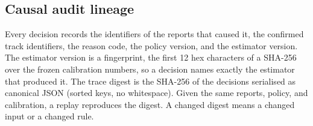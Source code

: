 \subsection{Causal audit lineage}
Every decision records the identifiers of the reports that caused it, the
confirmed track identifiers, the reason code, the policy version, and the
estimator version. The estimator version is a fingerprint, the first 12 hex
characters of a SHA-256 over the frozen calibration numbers, so a decision
names exactly the estimator that produced it. The trace digest is the SHA-256
of the decisions serialised as canonical JSON (sorted keys, no whitespace).
Given the same reports, policy, and calibration, a replay reproduces the
digest. A changed digest means a changed input or a changed rule.
